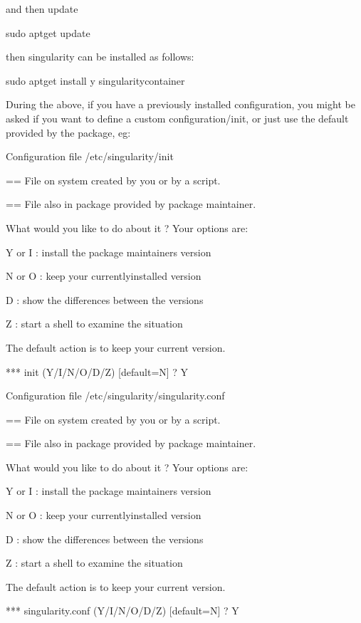 \documentclass[letterpaper,10pt,english]{sphinxmanual}
\begin{document}
and then update

%
\begin{sphinxVerbatim}[commandchars=\\\{\}]
sudo apt\PYGZhy{}get update
\end{sphinxVerbatim}

then singularity can be installed as follows:

%
\begin{sphinxVerbatim}[commandchars=\\\{\}]
sudo apt\PYGZhy{}get install \PYGZhy{}y singularity\PYGZhy{}container
\end{sphinxVerbatim}

During the above, if you have a previously installed configuration, you might be asked if you want to define a custom configuration/init, or just use the default provided by the package, eg:

%
\begin{sphinxVerbatim}[commandchars=\\\{\}]
Configuration file \PYGZsq{}/etc/singularity/init\PYGZsq{}

  ==\PYGZgt{} File on system created by you or by a script.

  ==\PYGZgt{} File also in package provided by package maintainer.

    What would you like to do about it ?  Your options are:

      Y or I  : install the package maintainer\PYGZsq{}s version

      N or O  : keep your currently\PYGZhy{}installed version

        D     : show the differences between the versions

        Z     : start a shell to examine the situation

The default action is to keep your current version.

*** init (Y/I/N/O/D/Z) [default=N] ? Y


Configuration file \PYGZsq{}/etc/singularity/singularity.conf\PYGZsq{}

  ==\PYGZgt{} File on system created by you or by a script.

  ==\PYGZgt{} File also in package provided by package maintainer.

    What would you like to do about it ?  Your options are:

      Y or I  : install the package maintainer\PYGZsq{}s version

      N or O  : keep your currently\PYGZhy{}installed version

        D     : show the differences between the versions

        Z     : start a shell to examine the situation

The default action is to keep your current version.

*** singularity.conf (Y/I/N/O/D/Z) [default=N] ? Y
\end{sphinxVerbatim}
\end{document}
